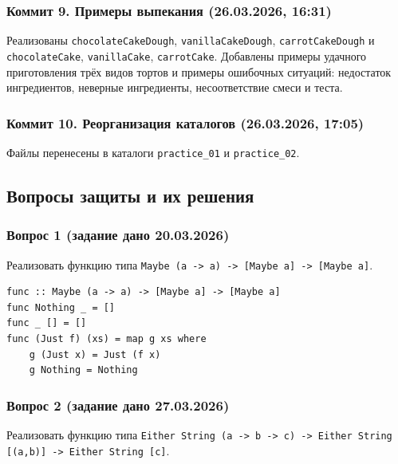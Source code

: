 \documentclass[a4paper, final]{article}
\newenvironment{code}{\captionsetup{type=listing}}{}
\begin{document}
\subsubsection{Коммит 9. Примеры выпекания (26.03.2026, 16:31)}

Реализованы \texttt{chocolateCakeDough}, \texttt{vanillaCakeDough},
\texttt{carrotCakeDough} и \texttt{chocolateCake}, \texttt{vanillaCake},
\texttt{carrotCake}. Добавлены примеры удачного приготовления трёх видов
тортов и примеры ошибочных ситуаций: недостаток ингредиентов, неверные
ингредиенты, несоответствие смеси и теста.

\subsubsection{Коммит 10. Реорганизация каталогов (26.03.2026, 17:05)}

Файлы перенесены в каталоги \texttt{practice\_01} и \texttt{practice\_02}.

\subsection{Вопросы защиты и их решения}

\subsubsection{Вопрос 1 (задание дано 20.03.2026)}

Реализовать функцию типа \texttt{Maybe (a -> a) -> [Maybe a] -> [Maybe a]}.

\begin{code}
\begin{verbatim}
func :: Maybe (a -> a) -> [Maybe a] -> [Maybe a]
func Nothing _ = []
func _ [] = []
func (Just f) (xs) = map g xs where
    g (Just x) = Just (f x)
    g Nothing = Nothing
\end{verbatim}
\caption*{Листинг 1: func — применение Maybe-функции к списку Maybe-значений}
\end{code}

\newpage
\subsubsection{Вопрос 2 (задание дано 27.03.2026)}

Реализовать функцию типа
\texttt{Either String (a -> b -> c) -> Either String [(a,b)] -> Either String [c]}.
\end{document}
